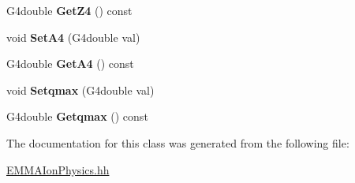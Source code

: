 \begin{DoxyCompactItemize}
\item 
\hypertarget{classEMMAIonPhysics_ac86b8b73057c46c28a3819e6d9b2c98c}{G4double {\bfseries Get\-Z4} () const }\label{classEMMAIonPhysics_ac86b8b73057c46c28a3819e6d9b2c98c}

\item 
\hypertarget{classEMMAIonPhysics_a0e7b413dc1481b997ba27c4b894968db}{void {\bfseries Set\-A4} (G4double val)}\label{classEMMAIonPhysics_a0e7b413dc1481b997ba27c4b894968db}

\item 
\hypertarget{classEMMAIonPhysics_a7ff3d97db511224bdd8bcba46594698c}{G4double {\bfseries Get\-A4} () const }\label{classEMMAIonPhysics_a7ff3d97db511224bdd8bcba46594698c}

\item 
\hypertarget{classEMMAIonPhysics_aa1fd35dff592a2493a3c8b6065bb70b1}{void {\bfseries Setqmax} (G4double val)}\label{classEMMAIonPhysics_aa1fd35dff592a2493a3c8b6065bb70b1}

\item 
\hypertarget{classEMMAIonPhysics_a99e12419723fd099c5c3e27ddad9fa90}{G4double {\bfseries Getqmax} () const }\label{classEMMAIonPhysics_a99e12419723fd099c5c3e27ddad9fa90}

\end{DoxyCompactItemize}


The documentation for this class was generated from the following file\-:\begin{DoxyCompactItemize}
\item 
\hyperlink{EMMAIonPhysics_8hh}{E\-M\-M\-A\-Ion\-Physics.\-hh}\end{DoxyCompactItemize}

